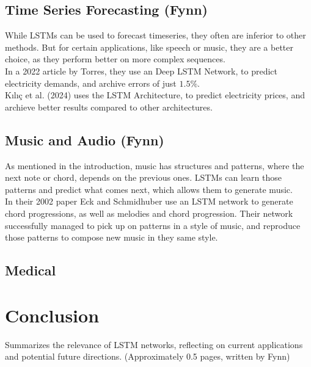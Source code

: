 \documentclass[twoside,a4paper,10pt,DIV=12,BCOR=12mm]{scrartcl}
\begin{document}
\subsection{Time Series Forecasting (Fynn)}
While LSTMs can be used to forecast timeseries, they often are inferior to other methods.\cite{gers2001timeseries} But for certain applications, like speech or music, they are a better choice, as they perform better on more complex sequences.\cite{gers2001timeseries, cahuantzi2023lstmvsgru}\\
In a 2022 article by Torres, they use an Deep LSTM Network, to predict electricity demands, and archive errors of just \begin{math}1.5\%\end{math}.\cite{torres2022elctricityforecasting}\\
Kılıç et al. (2024) uses the LSTM Architecture, to predict electricity prices, and archieve better results compared to other architectures.\cite{nielsen2024electricitypriceforcasting}

\subsection{Music and Audio (Fynn)}
As mentioned in the introduction, music has structures and patterns, where the next note or chord, depends on the previous ones. LSTMs can learn those patterns and predict what comes next, which allows them to generate music.\cite{eck2002musicgeneration}\\
In their 2002 paper Eck and Schmidhuber use an LSTM network to generate chord progressions, as well as melodies and chord progression. Their network successfully managed to pick up on patterns in a style of music, and reproduce those patterns to compose new music in they same style.\cite{eck2002musicgeneration}  
\subsection{Medical}

\section{Conclusion}

Summarizes the relevance of LSTM networks, reflecting on current applications and potential future directions.
(Approximately 0.5 pages, written by Fynn)



\end{document}
